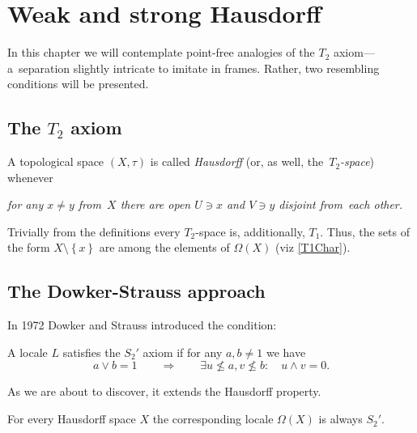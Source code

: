 \chapter{Weak and strong Hausdorff}

In this chapter we will contemplate point-free analogies of the $T_2$
axiom---a~separation slightly intricate to imitate in frames.
Rather, two resembling conditions will be presented.

\section{The $T_2$ axiom}

\begin{framed}
  \begin{df}[$T_2$]
    A topological space $(X, \tau)$ is called \emph{Hausdorff\/} (or, as well,
    the~\emph{$T_2$-space\/}) whenever
    \begin{center} \it
      for any $x \ne y$ from~$X$ there are open $U\owns x$ and $V\owns y$
      disjoint from~each other.
    \end{center}
  \end{df}
\end{framed}

\begin{rem} \label{T2->T1}
  Trivially from the definitions every $T_2$-space is, additionally, $T_1$.
  Thus, the sets of the form $X\setminus \left\{x\right\}$ are among the
  elements of $\Omega(X)$ (viz \ref{T1Char}).
\end{rem}

\section{The Dowker-Strauss approach}

In 1972 Dowker and Strauss \cite{ds72} introduced the condition:

\begin{framed}
  \begin{df}[$S_2'$]
    A locale $L$ satisfies the $S_2'$ axiom if for any $a, b \ne 1$ we have
    \[
      a \vee b = 1 \qquad \Rightarrow \qquad \exists u\not\leq a, v\not\leq
      b: \quad u \wedge v = 0.
    \]
  \end{df}
\end{framed}

As we are about to discover, it extends the Hausdorff property.

\begin{prop} \label{Haus->S2'}
  For every Hausdorff space $X$ the corresponding locale $\Omega(X)$ is always
  $S_2'$.
\end{prop}

